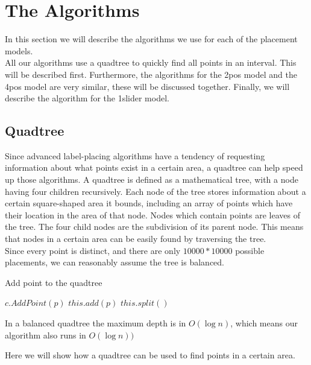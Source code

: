 \documentclass[crop=false,a4paper,oneside,11pt]{article}
\begin{document}
\section{The Algorithms}
In this section we will describe the algorithms we use for each of the placement models.\\
All our algorithms use a quadtree to quickly find all points in an interval. This will be described first. Furthermore, the algorithms for the 2pos model and the 4pos model are very similar, these will be discussed together. Finally, we will describe the algorithm for the 1slider model.

\subsection{Quadtree}

Since advanced label-placing algorithms have a tendency of requesting information about what points exist in a certain area, a quadtree can help speed up those algorithms. A quadtree is defined as a mathematical tree, with a node having four children recursively. Each node of the tree stores information about a certain square-shaped area it bounds, including an array of points which have their location in the area of that node. Nodes which contain points are leaves of the tree. The four child nodes are the subdivision of its parent node. This means that nodes in a certain area can be easily found by traversing the tree.\\
Since every point is distinct, and there are only $10000 * 10000$ possible placements, we can reasonably assume the tree is balanced.\\
\begin{algorithm}[H]
\caption{Add point to the quadtree}
\begin{algorithmic}[1]
\State $c.AddPoint(p)$
\EndIf
\EndFor
\Else{}
\State $this.add(p)$
\State $this.split()$ 
\EndIf
\EndIf
\EndProcedure
\end{algorithmic}
\end{algorithm}
In a balanced quadtree the maximum depth is in $O(\log{n})$, which means our algorithm also runs in $O(\log{n}))$

Here we will show how a quadtree can be used to find points in a certain area.\\
\end{document}
